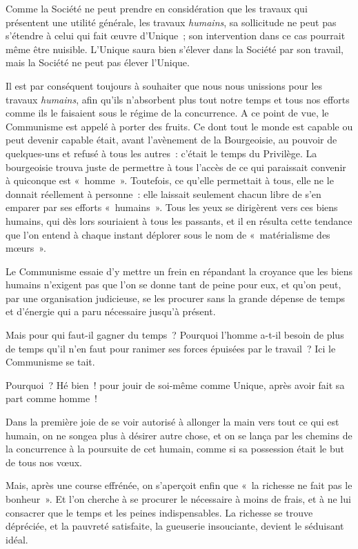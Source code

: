 \documentclass[french,twoside]{book} %
\begin{document}
Comme la Société ne peut prendre en considération que les travaux qui présentent une utilité générale, les travaux \emph{humains}, sa sollicitude ne peut pas s’étendre à celui qui fait œuvre d’Unique ; son intervention dans ce cas pourrait même être nuisible.  L’Unique saura bien s’élever dans la Société par son travail, mais la Société ne peut pas élever l’Unique.\par
Il est par conséquent toujours à souhaiter que nous nous unissions pour les travaux \emph{humains}, afin qu’ils n’absorbent plus tout notre temps et tous nos efforts comme ils le faisaient sous le régime de la concurrence. A ce point de vue, le Communisme est appelé à porter des fruits. Ce dont tout le monde est capable ou peut devenir capable était, avant l’avènement de la Bourgeoisie, au pouvoir de quelques-uns et refusé à tous les autres : c’était le temps du Privilège. La bourgeoisie trouva juste de permettre à tous l’accès de ce qui paraissait convenir à quiconque est « homme ». Toutefois, ce qu’elle permettait à tous, elle ne le donnait réellement à personne : elle laissait seulement chacun libre de s’en emparer par ses efforts « humains ». Tous les yeux se dirigèrent vers ces biens humains, qui dès lors souriaient à tous les passants, et il en résulta cette tendance que l’on entend à chaque instant déplorer sous le nom de « matérialisme des mœurs ».\par
Le Communisme essaie d’y mettre un frein en répandant la croyance que les biens humains n’exigent pas que l’on se donne tant de peine pour eux, et qu’on peut, par une organisation judicieuse, se les procurer sans la grande dépense de temps et d’énergie qui a paru nécessaire jusqu’à présent.\par
Mais pour qui faut-il gagner du temps ? Pourquoi l’homme a-t-il besoin de plus de temps qu’il n’en faut pour ranimer ses forces épuisées par le travail ? Ici le Communisme se tait.\par
Pourquoi ? Hé bien ! pour jouir de soi-même comme Unique, après avoir fait sa part comme homme !\par
Dans la première joie de se voir autorisé à allonger la main vers tout ce qui est humain, on ne songea plus à désirer autre chose, et on se lança par les chemins de la concurrence à la poursuite de cet humain,  comme si sa possession était le but de tous nos vœux.\par
Mais, après une course effrénée, on s’aperçoit enfin que « la richesse ne fait pas le bonheur ». Et l’on cherche à se procurer le nécessaire à moins de frais, et à ne lui consacrer que le temps et les peines indispensables. La richesse se trouve dépréciée, et la pauvreté satisfaite, la gueuserie insouciante, devient le séduisant idéal.\par
\end{document}
